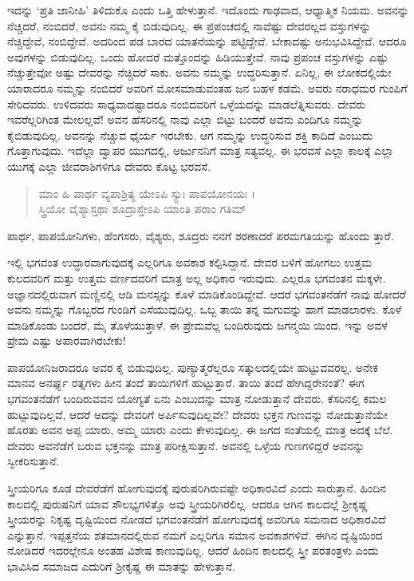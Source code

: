 ಇದನ್ನು ‘ಪ್ರತಿ ಜಾನೀಹಿ’ ತಿಳಿದುಕೊ ಎಂದು ಒತ್ತಿ ಹೇಳುತ್ತಾನೆ. ಇದೊಂದು ಗಾಢವಾದ, ಆಧ್ಯಾತ್ಮಿಕ ನಿಯಮ. ಅವನನ್ನು ನೆಚ್ಚಿದರೆ, ನಂಬಿದರೆ, ಅವನು ನಮ್ಮ ಕೈ ಬಿಡುವುದಿಲ್ಲ. ಈ ಪ್ರಪಂಚದಲ್ಲಿ ನಾವೆಷ್ಟು ದೇವರಲ್ಲದ ವಸ್ತುಗಳನ್ನು ನೆಚ್ಚಿದ್ದೇವೆ, ನಂಬಿದ್ದೇವೆ. ಅದರಿಂದ ಪಡ ಬಾರದ ಯಾತನೆಯನ್ನು ಪಟ್ಟಿದ್ದೇವೆ. ಬೇಕಾದಷ್ಟು ಅನುಭವಿಸಿದ್ದೇವೆ. ಆದರೂ ಅವುಗಳನ್ನು ಬಿಡುವುದಿಲ್ಲ. ಒಂದು ಹೋದರೆ ಮತ್ತೊಂದನ್ನು ಹಿಡಿಯುತ್ತೇವೆ. ನಾವು ಪ್ರಪಂಚ ವಸ್ತುಗಳನ್ನು ಎಷ್ಟು ನೆಚ್ಚುತ್ತೇವೋ ಅಷ್ಟು ದೇವರನ್ನು ನೆಚ್ಚಿದರೆ ಸಾಕು. ಅವನು ನಮ್ಮನ್ನು ಉದ್ಧರಿಸುತ್ತಾನೆ. ಏನಿಲ್ಲ, ಈ ಲೋಕದಲ್ಲಿಯೇ ಯಾರಾದರೂ ನಮ್ಮನ್ನು ನಂಬಿದರೆ ಅವರಿಗೆ ಮೋಸಮಾಡುವಂತಹ ಜನ ಬಹಳ ಕಡಮೆ. ಅವರು ನರಾಧಮರ ಗುಂಪಿಗೆ ಸೇರಿದವರು. ಉಳಿದವರು ಸಾಧ್ಯವಾದಷ್ಟಾದರೂ ನಂಬಿದವರಿಗೆ ಒಳ್ಳೆಯದನ್ನು ಮಾಡಲೆತ್ನಿಸುವರು. ದೇವರು ಇವರೆಲ್ಲರಿಗಿಂತ ಮೇಲಲ್ಲವೆ! ಅವನ ಹೆಸರಿನಲ್ಲಿ ನಾವು ಎಲ್ಲಾ ಬಿಟ್ಟು ಬಂದರೆ ಅವನು ಎಂದಿಗೂ ನಮ್ಮನ್ನು ಕೈಬಿಡುವುದಿಲ್ಲ. ಅವನನ್ನು ನೆಚ್ಚುವ ಧೈರ್ಯ ಇರಬೇಕು. ಆಗ ನಮ್ಮನ್ನು ಉದ್ಧರಿಸುವ ಶಕ್ತಿ ಕಾದಿದೆ ಎಂಬುದು ಗೊತ್ತಾಗುವುದು. ಇದೆಲ್ಲಾ ದ್ವಾಪರ ಯುಗದಲ್ಲಿ, ಅರ್ಜುನನಿಗೆ ಮಾತ್ರ ಸತ್ಯವಲ್ಲ. ಈ ಭರವಸೆ ಎಲ್ಲಾ ಕಾಲಕ್ಕೆ ಎಲ್ಲಾ ಯುಗಕ್ಕೆ ಎಲ್ಲಾ ಜೀವರಾಶಿಗಳಿಗೂ ದೇವರು ಕೊಟ್ಟ ಭರವಸೆ.

\begin{verse}
ಮಾಂ ಹಿ ಪಾರ್ಥ ವ್ಯಪಾಶ್ರಿತ್ಯ ಯೇಽಪಿ ಸ್ಯುಃ ಪಾಪಯೋನಯಃ ।\\ಸ್ತ್ರಿಯೋ ವೈಶ್ಯಾಸ್ತಥಾ ಶೂದ್ರಾಸ್ತೇಽಪಿ ಯಾಂತಿ ಪರಾಂ ಗತಿಮ್ 
\end{verse}

{\small ಪಾರ್ಥ, ಪಾಪಯೋನಿಗಳು, ಹೆಂಗಸರು, ವೈಶ್ಯರು, ಶೂದ್ರರು ನನಗೆ ಶರಣಾದರೆ ಪರಮಗತಿಯನ್ನು ಹೊಂದು ತ್ತಾರೆ.}

ಇಲ್ಲಿ ಭಗವಂತ ಉದ್ಧಾರವಾಗುವುದಕ್ಕೆ ಎಲ್ಲರಿಗೂ ಅವಕಾಶ ಕಲ್ಪಿಸಿದ್ದಾನೆ. ದೇವರ ಬಳಿಗೆ ಹೋಗಲು ಉತ್ತಮ ಕುಲದವರಿಗೆ ಮತ್ತು ಉತ್ತಮ ವರ್ಣದವರಿಗೆ ಮಾತ್ರ ಅಲ್ಲ ಅಧಿಕಾರ ಇರುವುದು. ಎಲ್ಲರೂ ಭಗವಂತನ ಮಕ್ಕಳೇ. ಅಜ್ಞಾನದಲ್ಲಿರುವಾಗ ಮಣ್ಣಿನಲ್ಲಿ ಆಡಿ ಮನಸ್ಸನ್ನು ಕೊಳೆ ಮಾಡಿಕೊಂಡಿದ್ದೇವೆ. ಆದರೆ ಭಗವಂತನೆಡೆಗೆ ನಾವು ಹೋದರೆ ಅವನು ನಮ್ಮನ್ನು ಗೊಬ್ಬರದ ಗುಂಡಿಗೆ ಎಸೆಯುವುದಿಲ್ಲ. ಒಬ್ಬ ತಾಯಿ ತನ್ನ ಮಗುವನ್ನು ಹಾಗೆ ಮಾಡಲಾರಳು. ಕೊಳೆ ಮಾಡಿಕೊಂಡು ಬಂದರೆ, ಮೈ ತೊಳೆಯುತ್ತಾಳೆ. ಈ ಪ್ರೇಮವೆಲ್ಲ ಬಂದಿರುವುದು ಜಗನ್ಮಯಿ ಯಿಂದ. ಇನ್ನು ಅವಳ ಪ್ರೇಮ ಎಷ್ಟು ಅಪಾರವಾಗಿರಬೇಕು!

ಪಾಪಯೋನಿಜರಾದರೂ ಅವರ ಕೈ ಬಿಡುವುದಿಲ್ಲ. ಪುಣ್ಯಾತ್ಮರೆಲ್ಲರೂ ಸತ್ಕುಲದಲ್ಲಿಯೇ ಹುಟ್ಟುವವರಲ್ಲ. ಅನೇಕ ಮಾನವ ಅನರ್ಘ್ಯ ರತ್ನಗಳು ಹೀನ ತಂದೆ ತಾಯಿಗಳಿಗೆ ಹುಟ್ಟುತ್ತಾರೆ. ತಾಯಿ ತಂದೆ ಹೇಗಿದ್ದರೇನಂತೆ? ಈಗ ಭಗವಂತನೆಡೆಗೆ ಬಂದಿರುವವನ ಯೋಗ್ಯತೆ ಏನು ಎಂಬುದನ್ನು ಮಾತ್ರ ನೋಡುತ್ತಾನೆ ದೇವರು. ಕೆಸರಿನಲ್ಲಿ ಕಮಲ ಹುಟ್ಟುವುದಿಲ್ಲವೆ, ಆದರೆ ಅದನ್ನು ದೇವರಿಗೆ ಅರ್ಪಿಸುವುದಿಲ್ಲವೇ? ದೇವರು ಭಕ್ತನ ಗುಣವನ್ನು ನೋಡುತ್ತಾನೆಯೇ ಹೊರತು ಅವನ ಅಪ್ಪ ಯಾರು, ಅಮ್ಮ ಯಾರು ಎಂದು ಕೇಳುವುದಿಲ್ಲ. ಈ ಜಗದ ಸಂತೆಯಲ್ಲಿ ಮಾತ್ರ ಅದಕ್ಕೆ ಬೆಲೆ. ದೇವರು ಅವನೆಡೆಗೆ ಬರುವ ಭಕ್ತನನ್ನು ಮಾತ್ರ ಪರೀಕ್ಷಿಸುತ್ತಾನೆ. ಅವನಲ್ಲಿ ಒಳ್ಳೆಯ ಗುಣಗಳಿದ್ದರೆ ಅವನನ್ನು ಸ್ವೀಕರಿಸುತ್ತಾನೆ.

ಸ್ತ್ರೀಯರಿಗೂ ಕೂಡ ದೇವರೆಡೆಗೆ ಹೋಗುವುದಕ್ಕೆ ಪುರುಷರಿಗಿರುವಷ್ಟೇ ಅಧಿಕಾರವಿದೆ ಎಂದು ಸಾರುತ್ತಾನೆ. ಹಿಂದಿನ ಕಾಲದಲ್ಲಿ ಪುರುಷನಿಗೆ ಯಾವ ಸೌಲಭ್ಯಗಳಿತ್ತೊ ಅವು ಸ್ತ್ರೀಯರಿಗಿರಲಿಲ್ಲ. ಆದರೂ ಆಗಿನ ಕಾಲದಲ್ಲೆ ಶ್ರೀಕೃಷ್ಣ ಸ್ತ್ರೀಯರನ್ನು ನಿಕೃಷ್ಟ ದೃಷ್ಟಿಯಿಂದ ನೋಡದೆ ಭಗವಂತನೆಡೆಗೆ ಹೋಗುವುದಕ್ಕೆ ಅವರಿಗೂ ಸಮನಾದ ಅಧಿಕಾರವಿದೆ ಎನ್ನುತ್ತಾನೆ. ಇಪ್ಪತ್ತನೆಯ ಶತಮಾನದಲ್ಲಿರುವ ನಮಗೆ ಎಲ್ಲರಿಗೂ ಸಮಾನ ಅವಕಾಶಗಳಿವೆ. ಈಗಿನ ದೃಷ್ಟಿಯಿಂದ ನೋಡಿದರೆ ಇದರಲ್ಲೇನೂ ಅಂತಹ ವಿಶೇಷ ಕಾಣುವುದಿಲ್ಲ. ಆದರೆ ಹಿಂದಿನ ಕಾಲದಲ್ಲಿ ಸ್ತ್ರೀ ಪರತಂತ್ರಳು ಎಂದು ಭಾವಿಸಿದ ಸಮಾಜದ ಎದುರಿಗೆ ಶ್ರೀಕೃಷ್ಣ ಈ ಮಾತನ್ನು ಹೇಳುತ್ತಾನೆ.

